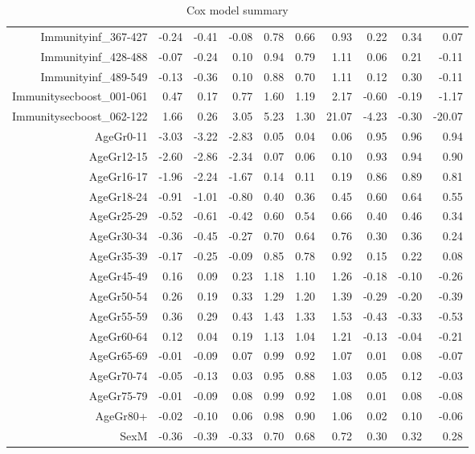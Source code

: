 \begin{table}[ht]
\begin{tabular}{rrrrrrrrrr}
  Immunityinf\_367-427 & -0.24 & -0.41 & -0.08 & 0.78 & 0.66 & 0.93 & 0.22 & 0.34 & 0.07 \\ 
  Immunityinf\_428-488 & -0.07 & -0.24 & 0.10 & 0.94 & 0.79 & 1.11 & 0.06 & 0.21 & -0.11 \\ 
  Immunityinf\_489-549 & -0.13 & -0.36 & 0.10 & 0.88 & 0.70 & 1.11 & 0.12 & 0.30 & -0.11 \\ 
  Immunitysecboost\_001-061 & 0.47 & 0.17 & 0.77 & 1.60 & 1.19 & 2.17 & -0.60 & -0.19 & -1.17 \\ 
  Immunitysecboost\_062-122 & 1.66 & 0.26 & 3.05 & 5.23 & 1.30 & 21.07 & -4.23 & -0.30 & -20.07 \\ 
  AgeGr0-11 & -3.03 & -3.22 & -2.83 & 0.05 & 0.04 & 0.06 & 0.95 & 0.96 & 0.94 \\ 
  AgeGr12-15 & -2.60 & -2.86 & -2.34 & 0.07 & 0.06 & 0.10 & 0.93 & 0.94 & 0.90 \\ 
  AgeGr16-17 & -1.96 & -2.24 & -1.67 & 0.14 & 0.11 & 0.19 & 0.86 & 0.89 & 0.81 \\ 
  AgeGr18-24 & -0.91 & -1.01 & -0.80 & 0.40 & 0.36 & 0.45 & 0.60 & 0.64 & 0.55 \\ 
  AgeGr25-29 & -0.52 & -0.61 & -0.42 & 0.60 & 0.54 & 0.66 & 0.40 & 0.46 & 0.34 \\ 
  AgeGr30-34 & -0.36 & -0.45 & -0.27 & 0.70 & 0.64 & 0.76 & 0.30 & 0.36 & 0.24 \\ 
  AgeGr35-39 & -0.17 & -0.25 & -0.09 & 0.85 & 0.78 & 0.92 & 0.15 & 0.22 & 0.08 \\ 
  AgeGr45-49 & 0.16 & 0.09 & 0.23 & 1.18 & 1.10 & 1.26 & -0.18 & -0.10 & -0.26 \\ 
  AgeGr50-54 & 0.26 & 0.19 & 0.33 & 1.29 & 1.20 & 1.39 & -0.29 & -0.20 & -0.39 \\ 
  AgeGr55-59 & 0.36 & 0.29 & 0.43 & 1.43 & 1.33 & 1.53 & -0.43 & -0.33 & -0.53 \\ 
  AgeGr60-64 & 0.12 & 0.04 & 0.19 & 1.13 & 1.04 & 1.21 & -0.13 & -0.04 & -0.21 \\ 
  AgeGr65-69 & -0.01 & -0.09 & 0.07 & 0.99 & 0.92 & 1.07 & 0.01 & 0.08 & -0.07 \\ 
  AgeGr70-74 & -0.05 & -0.13 & 0.03 & 0.95 & 0.88 & 1.03 & 0.05 & 0.12 & -0.03 \\ 
  AgeGr75-79 & -0.01 & -0.09 & 0.08 & 0.99 & 0.92 & 1.08 & 0.01 & 0.08 & -0.08 \\ 
  AgeGr80+ & -0.02 & -0.10 & 0.06 & 0.98 & 0.90 & 1.06 & 0.02 & 0.10 & -0.06 \\ 
  SexM & -0.36 & -0.39 & -0.33 & 0.70 & 0.68 & 0.72 & 0.30 & 0.32 & 0.28 \\ 
   \hline
\end{tabular}
\caption{Cox model summary} 
\end{table}
